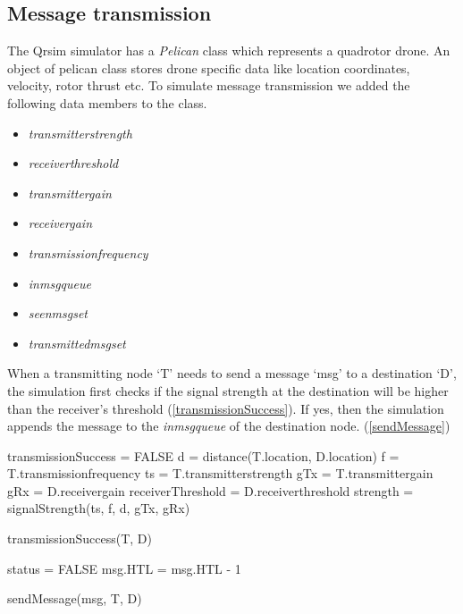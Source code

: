 \subsection{Message transmission}

The Qrsim simulator has a \emph{Pelican} class which represents a quadrotor drone. An object of pelican class stores drone specific data like location coordinates, velocity, rotor thrust etc. To simulate message transmission we added the following data members to the class.
\begin{itemize}
\item \emph{transmitter\textunderscore strength}
\item \emph{receiver\textunderscore threshold}
\item \emph{transmitter\textunderscore gain}
\item \emph{receiver\textunderscore gain}
\item \emph{transmission\textunderscore frequency}
\item \emph{in\textunderscore msg\textunderscore queue}
\item \emph{seen\textunderscore msg\textunderscore set}
\item \emph{transmitted\textunderscore msg\textunderscore set}
\end{itemize}

When a transmitting node `T' needs to send a message `msg' to a destination `D', the simulation first checks if the signal strength at the destination will be higher than the receiver's threshold (\ref{transmissionSuccess}). If yes, then the simulation appends the message to the \emph{in\textunderscore msg\textunderscore queue} of the destination node. (\ref{sendMessage})

\begin{algorithm}
\SetAlgoLined
\DontPrintSemicolon
{}
transmissionSuccess = FALSE\;
d = distance(T.location, D.location)\;
f = T.transmission\textunderscore frequency\;
ts = T.transmitter\textunderscore strength\;
gTx = T.transmitter\textunderscore gain\;
gRx = D.receiver\textunderscore gain\;
receiverThreshold = D.receiver\textunderscore threshold\;
strength = signalStrength(ts, f, d, gTx, gRx)\;

\caption{transmissionSuccess(T, D)} \label{transmissionSuccess}
\end{algorithm}

\begin{algorithm}
\DontPrintSemicolon
status = FALSE\;
msg.HTL = msg.HTL - 1\;

\caption{sendMessage(msg, T, D)} \label{sendMessage}
\end{algorithm}



